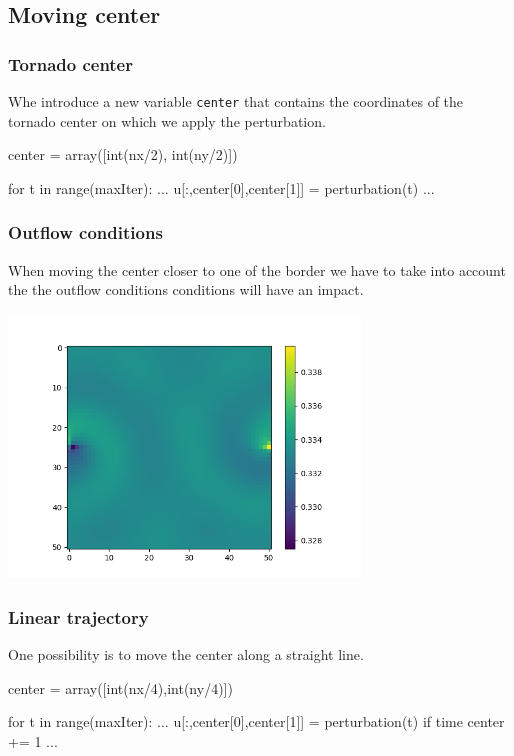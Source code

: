 \documentclass{beamer}
\begin{document}
\subsection*{Moving center}

\begin{frame}[fragile]
\frametitle{Tornado center}

Whe introduce a new variable \texttt{center} that contains the coordinates of the tornado center on which we apply the perturbation.\\
\bigskip\bigskip
\begin{python}
center = array([int(nx/2), int(ny/2)])

for t in range(maxIter):
   ...
   u[:,center[0],center[1]] = perturbation(t)
   ...

\end{python}

\vfill
\end{frame}

\begin{frame}[fragile]
\frametitle{Outflow conditions}
\bigskip
When moving the center closer to one of the border we have to take into account the the outflow conditions conditions will have an impact.
\begin{center}
\includegraphics[width=0.7\textwidth]{img/border_conditions.png}

\end{center}

\end{frame}

\begin{frame}[fragile]
\frametitle{Linear trajectory}
One possibility is to move the center along a straight line.\\
\bigskip\bigskip

\begin{python}
center = array([int(nx/4),int(ny/4)])

for t in range(maxIter):
   ...
   u[:,center[0],center[1]] = perturbation(t)
   if time%
      center += 1
   ...

\end{python}

\vfill
\end{frame}
\end{document}

